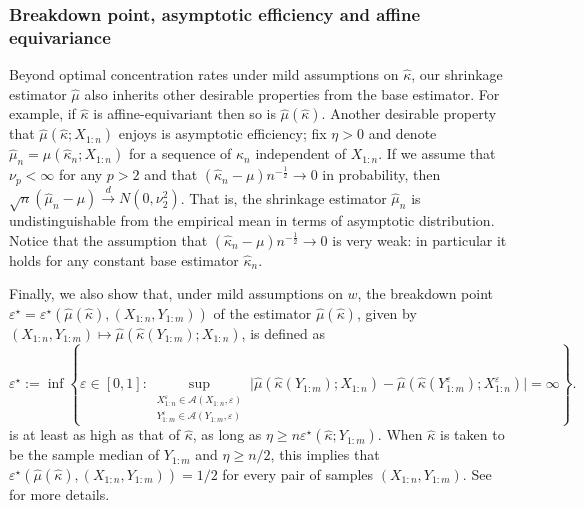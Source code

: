 \documentclass{article}
\theoremstyle{plain}
\theoremstyle{definition}
\def\sA{\mathcal{A}}
\begin{document}
\subsubsection{Breakdown point, asymptotic efficiency and affine equivariance}\label{sec:estimator_properties}
Beyond optimal concentration rates under mild assumptions on \( \widehat{\kappa }  \), our shrinkage estimator \( \widehat{\mu}  \) also inherits other desirable properties from the base estimator. For example, if \( \widehat{\kappa }  \) is affine-equivariant then so is \( \widehat{\mu }(\widehat{\kappa } )  \). Another desirable property that \( \widehat{\mu }(\widehat{\kappa }; X_{1:n} )  \) enjoys is asymptotic efficiency; fix \( \eta >0 \) and denote \( \widehat{\mu }_n = \widehat{\mu }(\widehat{\kappa }_n; X_{1:n} )    \) for a sequence of \(\widehat{\kappa }_n\) independent of $X_{1:n}$. If we assume that \( \nu_{p}< \infty \) for any \( p>2 \) and that \( (\widehat{\kappa }_n - \mu)n^{-\frac{1}{2}} \to 0  \) in probability, then \( \sqrt{n}(\widehat{\mu }_n - \mu  ) \overset{d}{\to}  N(0,\nu_2^2) \). That is, the shrinkage estimator \( \widehat{\mu }_n  \) is undistinguishable from the empirical mean in terms of asymptotic distribution. Notice that the assumption that \( (\widehat{\kappa }_n - \mu  )n^{-\frac{1}{2}} \to  0 \) is very weak: in particular it holds for any constant base estimator \( \widehat{\kappa}_n  \).  

Finally, we also show that, under mild assumptions on \( w \), the breakdown point \( \varepsilon^\star= \varepsilon^\star(\widehat{\mu }(\widehat{\kappa } ), (X_{1:n},Y_{1:m}) )\) of the estimator \( \widehat{\mu }(\widehat{\kappa } )  \), given by \( (X_{1:n},Y_{1:m}) \mapsto \widehat{\mu}(\widehat{\kappa }(Y_{1:m});X_{1:n} )  \), is defined as \[
  \varepsilon^\star := \inf \left\{\varepsilon\in [0,1] : \sup_{\substack{X_{1:n}^\varepsilon \in \sA(X_{1:n}, \varepsilon )\\Y_{1:m}^\varepsilon \in \sA(Y_{1:m}, \varepsilon ) }} \lvert \widehat{\mu }(\widehat{\kappa }(Y_{1:m}); X_{1:n})-\widehat{\mu }(\widehat{\kappa }(Y_{1:m}^\varepsilon ); X_{1:n}^\varepsilon )   \rvert = \infty \right\}. 
\] is at least as high as that of \( \widehat{\kappa }  \), as long as \( \eta \ge n \varepsilon ^\star(\widehat{\kappa }; Y_{1:m} ) \). When \( \widehat{\kappa }  \) is taken to be the sample median of \( Y_{1:m} \) and \( \eta \ge n / 2 \), this implies that \( \varepsilon ^\star(\widehat{\mu }(\widehat{\kappa } ),(X_{1:n},Y_{1:m})) = 1 / 2 \) for every pair of samples \( (X_{1:n},Y_{1:m}) \). %
See  for more details.
\end{document}
